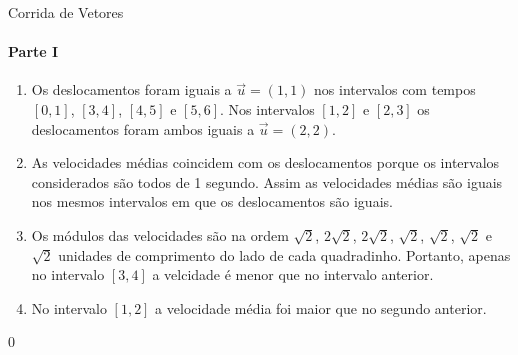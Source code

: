 \begin{answer}{Corrida de Vetores}
{
\paragraph{Parte I}

\begin{enumerate}
\item {} 
Os deslocamentos foram iguais a \(\vec{u} = (1,1)\) nos intervalos com tempos \([0,1]\), \([3,4]\), \([4,5]\) e \([5,6]\). Nos intervalos \([1,2]\) e \([2,3]\) os deslocamentos foram ambos iguais a \(\vec{u} = (2,2)\).

\item {} 
As velocidades médias coincidem com os deslocamentos porque os intervalos considerados são todos de 1 segundo. Assim as velocidades médias são iguais nos mesmos intervalos em que os deslocamentos são iguais.

\item {} 
Os módulos das velocidades são na ordem \(\sqrt{2}\), \(2\sqrt{2}\), \(2\sqrt{2}\), \(\sqrt{2}\), \(\sqrt{2}\), \(\sqrt{2}\) e \(\sqrt{2}\) unidades de comprimento do lado de cada quadradinho. Portanto, apenas no intervalo \([3,4]\) a velcidade é menor que no intervalo anterior.

\item {} 
No intervalo \([1,2]\) a velocidade média foi maior que no segundo anterior.

\end{enumerate}
}{0}
\end{answer}
\clearmargin

